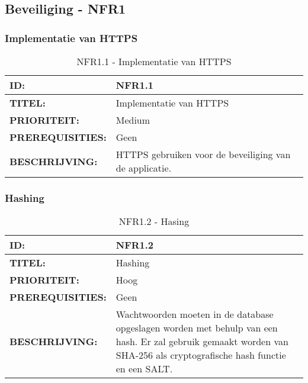 \subsection{Beveiliging - NFR1}

\subsubsection{Implementatie van HTTPS}
	\begin{table}[H]
	\caption{NFR1.1 - Implementatie van HTTPS}
    		\begin{tabular}{l | p{10cm}}
        \textbf{ID:} & NFR1.1 \\ \hline
        \textbf{TITEL:} & Implementatie van HTTPS \\ \hline
        \textbf{PRIORITEIT:} &  Medium \\ \hline
        \textbf{PREREQUISITIES:} & Geen\\ \hline
        \textbf{BESCHRIJVING:} & HTTPS gebruiken voor de beveiliging van de applicatie.\\
    \end{tabular} 
	\label{tab:NFR1.1 -Implementatie van HTTPS}
\end{table}

\subsubsection{Hashing}
	\begin{table}[H]
	\caption{NFR1.2 - Hasing}
    		\begin{tabular}{l | p{10cm}}
        \textbf{ID:} & NFR1.2 \\ \hline
        \textbf{TITEL:} & Hashing \\ \hline
        \textbf{PRIORITEIT:} &  Hoog \\ \hline
        \textbf{PREREQUISITIES:} & Geen\\ \hline
        \textbf{BESCHRIJVING:} & Wachtwoorden moeten in de database opgeslagen worden met behulp van een hash. Er zal gebruik gemaakt worden van SHA-256 als cryptografische hash functie en een SALT.\\
    \end{tabular} 
	\label{tab:NFR1.2 -Hashing}
\end{table}

